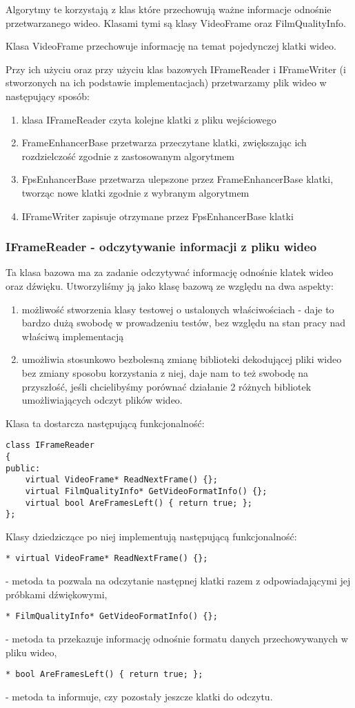 \documentclass[twoside]{projektInzynierskiMS}
\begin{document}
Algorytmy te korzystają z klas które przechowują ważne informacje odnośnie przetwarzanego wideo. Klasami tymi są klasy VideoFrame oraz FilmQualityInfo. 

Klasa VideoFrame przechowuje informację na temat pojedynczej klatki wideo.  

Przy ich użyciu oraz przy użyciu klas bazowych IFrameReader i IFrameWriter (i stworzonych na ich podstawie implementacjach) przetwarzamy plik wideo w następujący sposób:
\begin{enumerate}
\item klasa IFrameReader czyta kolejne klatki z pliku wejściowego
\item FrameEnhancerBase przetwarza przeczytane klatki, zwiększając ich rozdzielczość zgodnie z zastosowanym algorytmem
\item FpsEnhancerBase przetwarza ulepszone przez FrameEnhancerBase klatki, tworząc nowe klatki zgodnie z wybranym algorytmem
\item IFrameWriter zapisuje otrzymane przez FpsEnhancerBase klatki
\end{enumerate}

\subsubsection{IFrameReader - odczytywanie informacji z pliku wideo}
Ta klasa bazowa ma za zadanie odczytywać informację odnośnie klatek wideo oraz dźwięku. Utworzyliśmy ją jako klasę bazową ze względu na dwa aspekty:
\begin{enumerate}
\item możliwość stworzenia klasy testowej o ustalonych właściwościach - daje to bardzo dużą swobodę w prowadzeniu testów, bez względu na stan pracy nad właściwą implementacją
\item umożliwia stosunkowo bezbolesną zmianę biblioteki dekodującej pliki wideo bez zmiany sposobu korzystania z niej, daje nam to też swobodę na przyszłość, jeśli chcielibyśmy porównać działanie 2 różnych bibliotek umożliwiających odczyt plików wideo.
\end{enumerate}
Klasa ta dostarcza następującą funkcjonalność:
\begin{verbatim}
class IFrameReader
{
public:
    virtual VideoFrame* ReadNextFrame() {};
    virtual FilmQualityInfo* GetVideoFormatInfo() {};
    virtual bool AreFramesLeft() { return true; };
};
\end{verbatim}
Klasy dziedziczące po niej implementują następującą funkcjonalność:
\begin{verbatim}
* virtual VideoFrame* ReadNextFrame() {};
\end{verbatim}
- metoda ta pozwala na odczytanie następnej klatki razem z odpowiadającymi jej próbkami dźwiękowymi,
\begin{verbatim}
* FilmQualityInfo* GetVideoFormatInfo() {};
\end{verbatim}
- metoda ta przekazuje informację odnośnie formatu danych przechowywanych w pliku wideo,
\begin{verbatim}
* bool AreFramesLeft() { return true; };
\end{verbatim}
 - metoda ta informuje, czy pozostały jeszcze klatki do odczytu.
\end{document}
